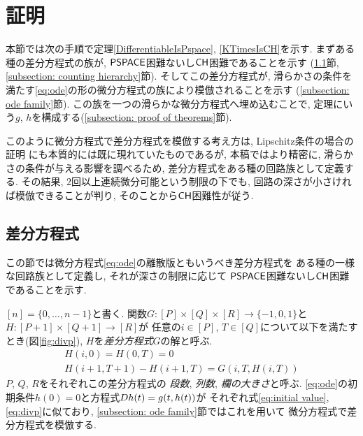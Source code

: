 \section{証明}
\label{section:differentiable}

本節では次の手順で定理\ref{DifferentiableIsPspace}, \ref{KTimesIsCH}を示す. 
まずある種の差分方程式の族が, 
$\mathsf{PSPACE}$困難ないし$\mathsf{CH}$困難であることを示す
(\ref{section:divp}節, \ref{subsection: counting hierarchy}節).
そしてこの差分方程式が, 
滑らかさの条件を満たす\eqref{eq:ode}の形の微分方程式の族により模倣されることを示す
(\ref{subsection: ode family}節). 
この族を一つの滑らかな微分方程式へ埋め込むことで, 
定理にいう$g$, $h$を構成する(\ref{subsection: proof of theorems}節).

このように微分方程式で差分方程式を模倣する考え方は, 
Lipschitz条件の場合の証明
\cite{kawamura2010lipschitz}にも本質的には既に現れていたものであるが, 
本稿ではより精密に, 滑らかさの条件が与える影響を調べるため, 
差分方程式をある種の回路族として定義する. 
その結果, 
$2$回以上連続微分可能という制限の下でも, 
回路の深さが小さければ模倣できることが判り, 
そのことから$\mathsf{CH}$困難性が従う. 

\subsection{差分方程式}
\label{section:divp}

この節では微分方程式\eqref{eq:ode}の離散版ともいうべき差分方程式を
ある種の一様な回路族として定義し, 
それが深さの制限に応じて
$\mathsf{PSPACE}$困難ないし$\mathsf{CH}$困難であることを示す.

$[n] = \{0, \dots , n-1\}$と書く.
関数$G \colon [P] \times [Q] \times [R] \to \{-1, 0, 1\}$と
$H \colon [P + 1] \times [Q+1] \to [R]$が
任意の$i \in [P]$, $T \in [Q]$について以下を満たすとき(図\ref{fig:divp}), 
$H$を\emph{差分方程式}\kern\xkanjiskip$G$の解と呼ぶ.
\begin{gather}
   H(i, 0) = H(0, T) = 0 \label{eq:initial value}
\\
   H(i + 1, T + 1) - H(i+1, T) = G(i, T, H(i, T))  \label{eq:divp}
\end{gather}
$P$, $Q$, $R$をそれぞれこの差分方程式の
\emph{段数}, \emph{列数}, \emph{欄の大きさ}と呼ぶ.
\eqref{eq:ode}の初期条件$h(0) = 0$と方程式$D h(t) = g(t, h(t))$が
それぞれ式\eqref{eq:initial value}, \eqref{eq:divp}に似ており, 
\ref{subsection: ode family}節ではこれを用いて
微分方程式で差分方程式を模倣する. 

